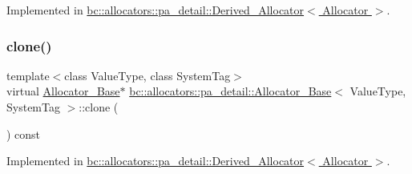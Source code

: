 Implemented in \hyperlink{structbc_1_1allocators_1_1pa__detail_1_1Derived__Allocator_acbfe2862777bf8810e925d78c9511a66}{bc\+::allocators\+::pa\+\_\+detail\+::\+Derived\+\_\+\+Allocator$<$ Allocator $>$}.

\mbox{\label{structbc_1_1allocators_1_1pa__detail_1_1Allocator__Base_abb9ba3168afaead6638e81f618f74b48}} 
\subsubsection{\texorpdfstring{clone()}{clone()}}
{\footnotesize\ttfamily template$<$class Value\+Type, class System\+Tag$>$ \\
virtual \hyperlink{structbc_1_1allocators_1_1pa__detail_1_1Allocator__Base}{Allocator\+\_\+\+Base}$\ast$ \hyperlink{structbc_1_1allocators_1_1pa__detail_1_1Allocator__Base}{bc\+::allocators\+::pa\+\_\+detail\+::\+Allocator\+\_\+\+Base}$<$ Value\+Type, System\+Tag $>$\+::clone (\begin{DoxyParamCaption}{ }\end{DoxyParamCaption}) const\hspace{0.3cm}{\ttfamily [pure virtual]}}



Implemented in \hyperlink{structbc_1_1allocators_1_1pa__detail_1_1Derived__Allocator_af11b1d876a4b0f7c7eb54231730eb3a8}{bc\+::allocators\+::pa\+\_\+detail\+::\+Derived\+\_\+\+Allocator$<$ Allocator $>$}.

\mbox{\label{structbc_1_1allocators_1_1pa__detail_1_1Allocator__Base_a02eb1291b28c3d83c53f973df47b9caa}} 

